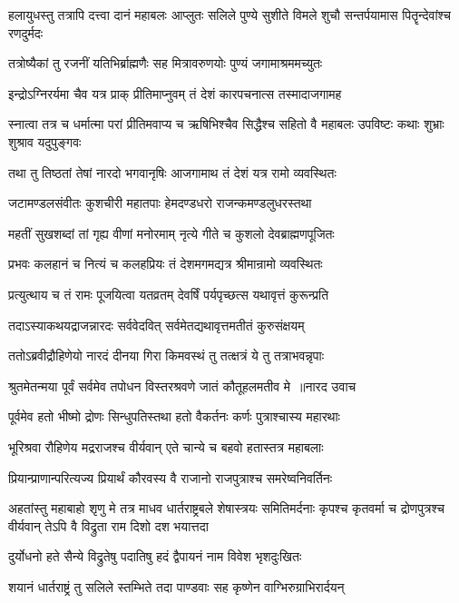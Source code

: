 \threelineshloka
{हलायुधस्तु तत्रापि दत्त्वा दानं महाबलः}
{आप्लुतः सलिले पुण्ये सुशीते विमले शुचौ}
{सन्तर्पयामास पितॄन्देवांश्च रणदुर्मदः}


\twolineshloka
{तत्रोष्यैकां तु रजनीं यतिभिर्ब्राह्मणैः सह}
{मित्रावरुणयोः पुण्यं जगामाश्रममच्युतः}


\twolineshloka
{इन्द्रोऽग्निरर्यमा चैव यत्र प्राक् प्रीतिमाप्नुवम्}
{तं देशं कारपचनात्स तस्मादाजगामह}


\threelineshloka
{स्नात्वा तत्र च धर्मात्मा परां प्रीतिमवाप्य च}
{ऋषिभिश्चैव सिद्धैश्च सहितो वै महाबलः}
{उपविष्टः कथाः शुभ्राः शुश्राव यदुपुङ्गवः}


\twolineshloka
{तथा तु तिष्ठतां तेषां नारदो भगवानृषिः}
{आजगामाथ तं देशं यत्र रामो व्यवस्थितः}


\twolineshloka
{जटामण्डलसंवीतः कुशचीरी महातपाः}
{हेमदण्डधरो राजन्कमण्डलुधरस्तथा}


\twolineshloka
{महतीं सुखशब्दां तां गृह्य वीणां मनोरमाम्}
{नृत्ये गीते च कुशलो देवब्राह्मणपूजितः}


\twolineshloka
{प्रभवः कलहानं च नित्यं च कलहप्रियः}
{तं देशमगमद्यत्र श्रीमान्रामो व्यवस्थितः}


\twolineshloka
{प्रत्युत्थाय च तं रामः पूजयित्वा यतव्रतम्}
{देवर्षिं पर्यपृच्छत्स यथावृत्तं कुरून्प्रति}


\twolineshloka
{तदाऽस्याकथयद्राजन्नारदः सर्ववेदवित्}
{सर्वमेतद्यथावृत्तमतीतं कुरुसंक्षयम्}


\twolineshloka
{ततोऽब्रवीद्रौहिणेयो नारदं दीनया गिरा}
{किमवस्थं तु तत्क्षत्रं ये तु तत्राभवन्नृपाः}


\threelineshloka
{श्रुतमेतन्मया पूर्वं सर्वमेव तपोधन}
{विस्तरश्रवणे जातं कौतूहलमतीव मे ॥नारद उवाच}
{}


\twolineshloka
{पूर्वमेव हतो भीष्मो द्रोणः सिन्धुपतिस्तथा}
{हतो वैकर्तनः कर्णः पुत्राश्चास्य महारथाः}


\twolineshloka
{भूरिश्रवा रौहिणेय मद्रराजश्च वीर्यवान्}
{एते चान्ये च बहवो हतास्तत्र महाबलाः}


\twolineshloka
{प्रियान्प्राणान्परित्यज्य प्रियार्थं कौरवस्य वै}
{राजानो राजपुत्राश्च समरेष्वनिवर्तिनः}


अहतांस्तु महाबाहो शृणु मे तत्र माधव
\threelineshloka
{धार्तराष्ट्रबले शेषास्त्रयः समितिमर्दनाः}
{कृपश्च कृतवर्मा च द्रोणपुत्रश्च वीर्यवान्}
{तेऽपि वै विद्रुता राम दिशो दश भयात्तदा}


\twolineshloka
{दुर्योधनो हते सैन्ये विद्रुतेषु पदातिषु}
{हदं द्वैपायनं नाम विवेश भृशदुःखितः}


\twolineshloka
{शयानं धार्तराष्ट्रं तु सलिले स्तम्भिते तदा}
{पाण्डवाः सह कृष्णेन वाग्भिरुग्राभिरार्दयन्}


